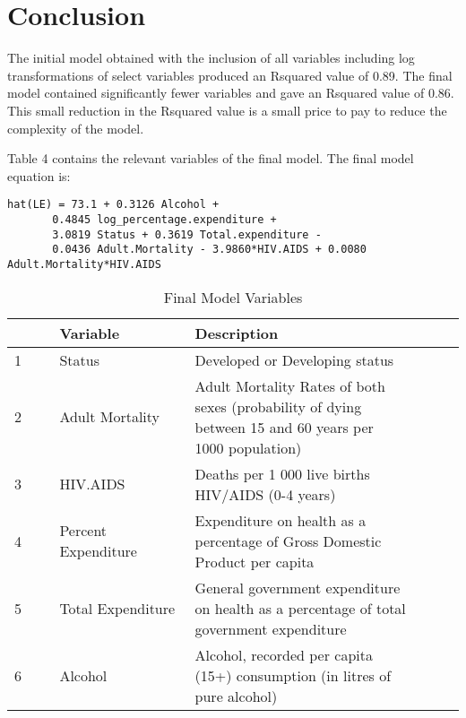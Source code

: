 
\section{Conclusion}
\label{sec:conclusion}

The initial model obtained with the inclusion of all variables including log transformations of select variables produced an Rsquared value of 0.89. The final model contained significantly fewer variables and gave an Rsquared value of 0.86. This small reduction in the Rsquared value is a small price to pay to reduce the complexity of the model.

Table 4 contains the relevant variables of the final model. The final model equation is:

\begin{verbatim}
hat(LE) = 73.1 + 0.3126 Alcohol + 
       0.4845 log_percentage.expenditure + 
       3.0819 Status + 0.3619 Total.expenditure - 
       0.0436 Adult.Mortality - 3.9860*HIV.AIDS + 0.0080 Adult.Mortality*HIV.AIDS
\end{verbatim}



\begin{table}[ht]
\centering
\begin{tabular}{@{}p{0.1\linewidth}  p{0.3\linewidth}p{0.5\linewidth}p{0.1\linewidth}@{}}
  \toprule
 & Variable & Description \\ 
  \midrule

1 & Status & Developed or Developing status \\ 
  2 & Adult Mortality &  Adult Mortality Rates of both sexes (probability of dying between 15 and 60 years per 1000 population) \\ 
  3 & HIV.AIDS &  Deaths per 1 000 live births HIV/AIDS (0-4 years) \\ 
  4 & Percent Expenditure &  Expenditure on health as a percentage of Gross Domestic Product per capita\\ 
  5 & Total Expenditure &  General government expenditure on health as a percentage of total government expenditure \\ 
 6 & Alcohol &  Alcohol, recorded per capita (15+) consumption (in litres of pure alcohol)\\

\bottomrule
\end{tabular}
\caption{Final Model Variables}
\label{tab:missing}
\end{table}

